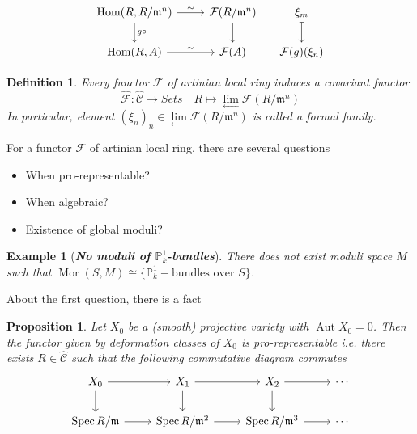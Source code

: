 \documentclass{ctexart}
\newtheorem{definition}{Definition}[section]
\newtheorem{proposition}{Proposition}[section]
\newtheorem{example}{Example}[section]
\renewcommand{\hom}{\operatorname{Hom}}
\newcommand{\mor}{\operatorname{Mor}}
\newcommand{\aut}{\operatorname{Aut}}
\newcommand{\spec}{\operatorname{Spec}}
\newcommand{\inverselimit}{\underset{\longleftarrow}{\lim}}
\begin{document}
\begin{equation}
    \begin{tikzcd}[column sep= small]
        \hom(R, R/\mathfrak{m}^{n}) \arrow[rr, "\sim"] \arrow[d, "g \circ"] &&
        \mathcal{F}(R/\mathfrak{m}^{n}) \arrow[d] &
        \xi_{m} \arrow[d, mapsto] \\
        \hom(R, A) \arrow[rr, "\sim"] &&
        \mathcal{F}(A) &
        \mathcal{F}(g)(\xi_{n})
    \end{tikzcd}
\end{equation}
\begin{definition}
    Every functor $\mathcal{F}$ of artinian local ring induces a covariant functor
    \begin{equation}
        \widehat{\mathcal{F}}: \widehat{\mathcal{C}} \longrightarrow Sets\quad R \longmapsto \inverselimit \mathcal{F}(R/\mathfrak{m}^{n})
    \end{equation}
    In particular, element $(\xi_{n})_{n}\in \inverselimit \mathcal{F}(R/\mathfrak{m}^{n})$ is called a formal family.
\end{definition}
For a functor $\mathcal{F}$ of artinian local ring, there are several questions
\begin{itemize}
    \item When pro-representable?
    \item When algebraic?
    \item Existence of global moduli?
\end{itemize}
\begin{example}[\textbf{\emph{No moduli of $\mathbb{P}_{k}^{1}$-bundles}}]
    There does not exist moduli space $M$ such that $\mor(S, M) \cong \{\mathbb{P}_{k}^{1}-\text{bundles over } S\}$.
    \label{example:no_moduli_of_bundles_on_projective_line}
\end{example}
About the first question, there is a fact
\begin{proposition}
    Let $X_{0}$ be a (smooth) projective variety with $\aut{X_{0}} = 0$.
    Then the functor given by deformation classes of $X_{0}$ is pro-representable i.e. there exists $R\in \widehat{\mathcal{C}}$ such that the following commutative diagram commutes
    \begin{equation}
        \begin{tikzcd}
            X_{0} \arrow[r] \arrow[d] &
            X_{1} \arrow[r] \arrow[d] &
            X_{2} \arrow[r] \arrow[d] &
            \cdots \\
            \spec R/\mathfrak{m} \arrow[r] &
            \spec R/\mathfrak{m}^{2} \arrow[r] &
            \spec R/\mathfrak{m}^{3} \arrow[r] &
            \cdots
        \end{tikzcd}
    \end{equation}
    \label{Proposition 3.1}
\end{proposition}
\end{document}
